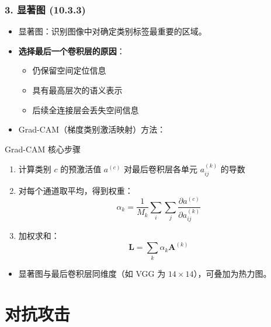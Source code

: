 \documentclass[t,aspectratio=169]{beamer} %
\begin{document}
\begin{frame}[allowframebreaks]
    \frametitle{3. 显著图 (10.3.3)}
    \begin{itemize}
        \item \alert{显著图}：识别图像中对确定类别标签\alert{最重要的区域}。
        \item \textbf{选择最后一个卷积层的原因}：
        \begin{itemize}
            \item 仍保留\alert{空间定位}信息
            \item 具有\alert{最高层次的语义}表示
            \item 后续全连接层会丢失空间信息
        \end{itemize}
        \item \alert{Grad-CAM}（梯度类别激活映射）方法：
    \end{itemize}
    \begin{block}{Grad-CAM 核心步骤}
        \begin{enumerate}
            \item 计算类别 $c$ 的预激活值 $a^{(c)}$ 对最后卷积层各单元 $a_{ij}^{(k)}$ 的导数
            \item 对每个通道取平均，得到权重：
            \begin{equation}
                \alpha_k = \frac{1}{M_k} \sum_i \sum_j \frac{\partial a^{(c)}}{\partial a_{ij}^{(k)}}
                \tag{10.9}
            \end{equation}
            \item 加权求和：
            \begin{equation}
                \mathbf{L} = \sum_k \alpha_k \mathbf{A}^{(k)}
                \tag{10.10}
            \end{equation}
        \end{enumerate}
    \end{block}
    \begin{itemize}
        \item 显著图与最后卷积层同维度（如 VGG 为 $14 \times 14$），可叠加为热力图。
    \end{itemize}
\end{frame}

\section{对抗攻击}
\end{document}
